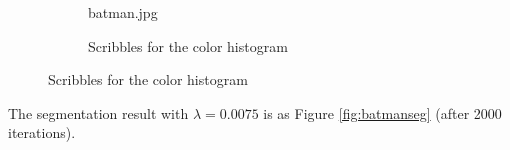 \documentclass[paper=a4, fontsize=11pt]{scrartcl} %
\numberwithin{equation}{section} %
\numberwithin{figure}{section} %
\numberwithin{table}{section} %
\begin{document}
\graphicspath{{results/}}
\begin{figure}[H]
	\caption{batman.jpg \label{fig:batman}}
	\centering
	\begin{subfigure}[b]{0.45\textwidth}
		\noindent{}
	\caption{batman.jpg \label{fig:vaorig}}
	\end{subfigure}
	\hspace{5mm}
	\begin{subfigure}[b]{0.45\textwidth}
		\noindent{}
	\caption{Scribbles for the color histogram \label{fig:vadenoised}}
	\end{subfigure}
\end{figure}

\pagebreak

The segmentation result with $\lambda = 0.0075$ is as Figure \ref{fig:batmanseg} (after 2000 iterations). 
\end{document}
